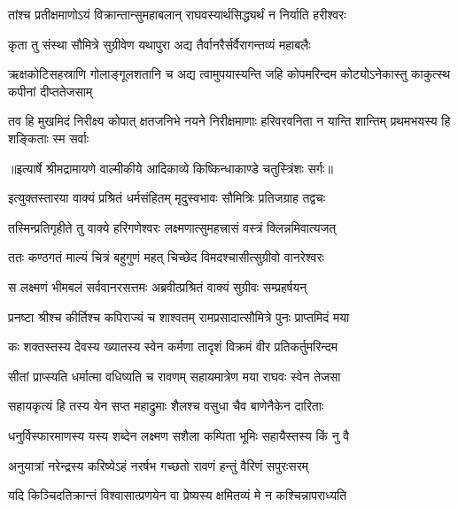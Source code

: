 \twolineshloka
{तांश्च प्रतीक्षमाणोऽयं विक्रान्तान्सुमहाबलान्}
{राघवस्यार्थसिद्ध्यर्थं न निर्याति हरीश्वरः} %

\twolineshloka
{कृता तु संस्था सौमित्रे सुग्रीवेण यथापुरा}
{अद्य तैर्वानरैर्सर्वैरागन्तव्यं महाबलैः} %

\threelineshloka
{ऋक्षकोटिसहस्राणि गोलाङ्गूलशतानि च}
{अद्य त्वामुपयास्यन्ति जहि कोपमरिन्दम}
{कोट्योऽनेकास्तु काकुत्स्थ कपीनां दीप्ततेजसाम्} %

\fourlineindentedshloka
{तव हि मुखमिदं निरीक्ष्य कोपात्}
{क्षतजनिभे नयने निरीक्षमाणाः}
{हरिवरवनिता न यान्ति शान्तिम्}
{प्रथमभयस्य हि शङ्किताः स्म सर्वाः} %


{॥इत्यार्षे श्रीमद्रामायणे वाल्मीकीये आदिकाव्ये किष्किन्धाकाण्डे चतुस्त्रिंशः सर्गः॥}


\twolineshloka
{इत्युक्तस्तारया वाक्यं प्रश्रितं धर्मसंहितम्}
{मृदुस्वभावः सौमित्रिः प्रतिजग्राह तद्वचः} %

\twolineshloka
{तस्मिन्प्रतिगृहीते तु वाक्ये हरिगणेश्वरः}
{लक्ष्मणात्सुमहत्त्रासं वस्त्रं क्लिन्नमिवात्यजत्} %

\twolineshloka
{ततः कण्ठगतं माल्यं चित्रं बहुगुणं महत्}
{चिच्छेद विमदश्चासीत्सुग्रीवो वानरेश्वरः} %

\twolineshloka
{स लक्ष्मणं भीमबलं सर्ववानरसत्तमः}
{अब्रवीत्प्रश्रितं वाक्यं सुग्रीवः सम्प्रहर्षयन्} %

\twolineshloka
{प्रनष्टा श्रीश्च कीर्तिश्च कपिराज्यं च शाश्वतम्}
{रामप्रसादात्सौमित्रे पुनः प्राप्तमिदं मया} %

\twolineshloka
{कः शक्तस्तस्य देवस्य ख्यातस्य स्वेन कर्मणा}
{तादृशं विक्रमं वीर प्रतिकर्तुमरिन्दम} %

\twolineshloka
{सीतां प्राप्स्यति धर्मात्मा वधिष्यति च रावणम्}
{सहायमात्रेण मया राघवः स्वेन तेजसा} %

\twolineshloka
{सहायकृत्यं हि तस्य येन सप्त महाद्रुमाः}
{शैलश्च वसुधा चैव बाणेनैकेन दारिताः} %

\twolineshloka
{धनुर्विस्फारमाणस्य यस्य शब्देन लक्ष्मण}
{सशैला कम्पिता भूमिः सहायैस्तस्य किं नु वै} %

\twolineshloka
{अनुयात्रां नरेन्द्रस्य करिष्येऽहं नरर्षभ}
{गच्छतो रावणं हन्तुं वैरिणं सपुरःसरम्} %

\twolineshloka
{यदि किञ्चिदतिक्रान्तं विश्वासात्प्रणयेन वा}
{प्रेष्यस्य क्षमितव्यं मे न कश्चिन्नापराध्यति} %

